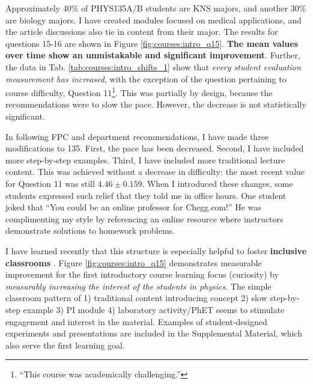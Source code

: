 \documentclass[../../main.tex]{subfiles}
\begin{document}
Approximately 40\% of PHYS135A/B students are KNS majors, and another 30\% are biology majors.  I have created modules focused on medical applications, and the article discussions also tie in content from their major.  The results for questions 15-16 are shown in Figure \ref{fig:courses:intro_q15}.  \textbf{The mean values over time show an unmistakable and significant improvement}.  Further, the data in Tab. \ref{tab:courses:intro_shifts_1} show that \textit{every student evaluation measurement has increased}, with the exception of the question pertaining to course difficulty, Question 11\footnote{``This course was academically challenging.''}.  This was partially by design, because the recommendations were to slow the pace.  However, the decrease is not statistically significant.  \\ \hspace{0.1cm}

In following FPC and department recommendations, I have made three modifications to 135.  First, the pace has been decreased.  Second, I have included more step-by-step examples.  Third, I have included more traditional lecture content.  This was achieved without a decrease in difficulty: the most recent value for Question 11 was still $4.46 \pm 0.159$.  When I introduced these changes, some students expressed such relief that they told me in office hours.  One student joked that ``You could be an online professor for Chegg.com!'' He was complimenting my style by referencing an online resource where instructors demonstrate solutions to homework problems.  \\ \hspace{0.1cm}

I have learned recently that this structure is especially helpful to foster \textbf{inclusive classrooms} \cite{inclusive}. Figure \ref{fig:courses:intro_q15} demonstrates measurable improvement for the first introductory course learning focus (curiosity) by \textit{measurably increasing the interest of the students in physics}.  The simple classroom pattern of 1) traditional content introducing concept 2) slow step-by-step example 3) PI module 4) laboratory activity/PhET seems to stimulate engagement and interest in the material.  Examples of student-designed experiments and presentations are included in the Supplemental Material, which also serve the first learning goal.\\ \hspace{0.1cm}
\end{document}
